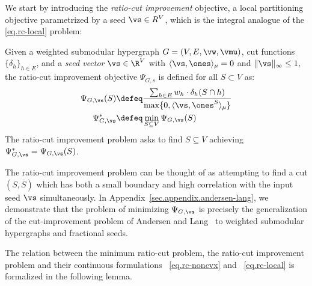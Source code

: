 \documentclass[letterpaper]{article}
\begin{document}
We start by introducing the \emph{ratio-cut improvement} objective, a local partitioning objective parametrized by a seed $\vs \in R^V$, which is the integral analogue of the \eqref{eq.rc-local} problem:
\begin{definition}
\label{def.rc-improve}
Given a weighted submodular hypergraph $G = (V, E, \vw, \vmu)$, cut functions $\{ \delta_h \}_{h \in E}$, and a \emph{seed vector} $\vs \in \R^V$ with $\langle \vs, \ones \rangle_\mu = 0$ and $\lVert \vs \rVert_\infty \leq 1,$ the ratio-cut improvement objective $\Psi_{G,s}$ is defined for all $S \subset V$ as:
\begin{align*}
\Psi_{G, \vs}(S)
&
\defeq
\frac{\sum_{h \in E} w_{h} \cdot \delta_h(S\cap h)} {\max\{0,\langle \vs, \ones^S \rangle_{\mu}\}} \\
\Psi^*_{G, \vs}
&\defeq \min_{S \subseteq V} \Psi_{G, \vs}(S)
\end{align*}
The ratio-cut improvement problem asks to find $S \subseteq V$ achieving $\Psi^*_{G, \vs} = \Psi_{G, \vs}(S)$.
\end{definition}

The ratio-cut improvement problem can be thought of as attempting to find a cut $(S,\overline{S})$ which has both a small boundary and high correlation with the input seed $\vs$ simultaneously. In Appendix~\ref{sec.appendix.andersen-lang}, we demonstrate that the problem of minimizing $\Psi_{G,\vs}$ is precisely the generalization of the cut-improvement problem of Andersen and Lang~\cite{Andersen-Lang} to weighted submodular hypergraphs and fractional seeds.

The relation between the minimum ratio-cut problem, the ratio-cut improvement problem and their continuous formulations ~\eqref{eq.rc-noncvx} and ~\eqref{eq.rc-local} is formalized in the following lemma.
\end{document}
